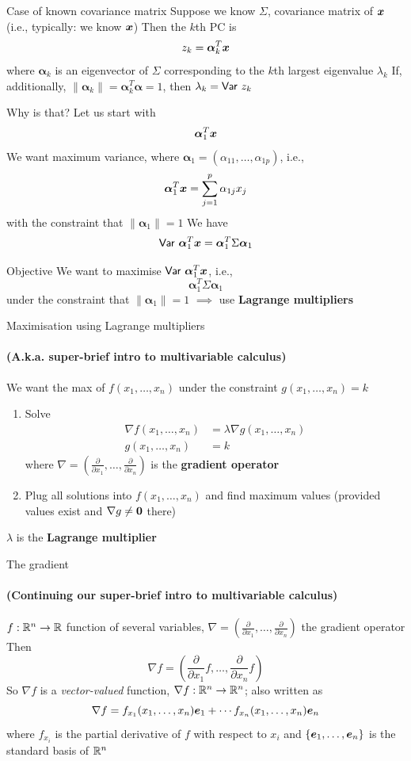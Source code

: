 \documentclass[aspectratio=169]{beamer}\usepackage[]{graphicx}\usepackage[]{xcolor}
\begin{document}
\begin{frame}{Case of known covariance matrix}
Suppose we know $\Sigma$, covariance matrix of $\bm{x}$ (i.e., typically: we know $\bm{x}$)
\vfill
Then the $k$th PC is 
\[
z_k=\bm{\alpha}_k^T\bm{x}
\]
where $\bm{\alpha}_k$ is an eigenvector of $\Sigma$ corresponding to the $k$th largest eigenvalue $\lambda_k$
\vfill
If, additionally, $\|\bm{\alpha}_k\|=\bm{\alpha}_k^T\bm{\alpha}=1$, then $\lambda_k=\mathsf{Var}\  z_k$
\end{frame}


\begin{frame}{Why is that?}
Let us start with
\[
\bm{\alpha}_1^T\bm{x}
\]
\vfill
We want maximum variance, where $\bm{\alpha}_1=(\alpha_{11},\ldots,\alpha_{1p})$, i.e.,
\[
\bm{\alpha}_1^T\bm{x} = \sum_{j=1}^p\alpha_{1j}x_j
\]
with the constraint that $\|\bm{\alpha}_1\|=1$
\vfill
We have
\[
\mathsf{Var}\  \bm{\alpha}_1^T\bm{x}
=\bm{\alpha}_1^T\Sigma\bm{\alpha}_1
\]
\end{frame}

\begin{frame}{Objective}
We want to maximise $\mathsf{Var}\  \bm{\alpha}_1^T\bm{x}$, i.e.,
\[
\bm{\alpha}_1^T\Sigma\bm{\alpha}_1
\]
under the constraint that $\|\bm{\alpha}_1\|=1$
\vfill
$\implies$ use \textbf{Lagrange multipliers}
\end{frame}


\begin{frame}{Maximisation using Lagrange multipliers}
\framesubtitle{(A.k.a. super-brief intro to multivariable calculus)}
We want the max of $f(x_1,\ldots,x_n)$ under the constraint $g(x_1,\ldots,x_n)=k$
\begin{enumerate}
\item Solve
\begin{align*}
\nabla f(x_1,\ldots,x_n) &= \lambda\nabla g(x_1,\ldots,x_n) \\
g(x_1,\ldots,x_n) &= k
\end{align*}
where $\nabla=(\frac{\partial}{\partial x_1},\ldots,\frac{\partial}{\partial x_n})$ is the \textbf{gradient operator}
\item Plug all solutions into $f(x_1,\ldots,x_n)$ and find maximum values (provided values exist and $\nabla g\neq \b0$ there)
\end{enumerate}
\vfill
$\lambda$ is the \textbf{Lagrange multiplier}
\end{frame}


\begin{frame}{The gradient}
\framesubtitle{(Continuing our super-brief intro to multivariable calculus)}
$f:\mathbb{R}^n\to\mathbb{R}$ function of several variables, $\nabla=\left(\frac{\partial}{\partial x_1},\ldots,\frac{\partial}{\partial x_n}\right)$ the gradient operator
\vfill
Then
\[
\nabla f = \left(
\frac{\partial}{\partial x_1}f,\ldots,
\frac{\partial}{\partial x_n}f
\right)
\]
\vfill
So $\nabla f$ is a \emph{vector-valued} function, $\nabla f:\mathbb{R}^n\to\mathbb{R}^n$; also written as
\[
\nabla f = f_{x_1}(x_1,\ldots,x_n)\bm{e}_1+\cdots f_{x_n}(x_1,\ldots,x_n)\bm{e}_n
\]
where $f_{x_i}$ is the partial derivative of $f$ with respect to $x_i$ and $\{\bm{e}_1,\ldots,\bm{e}_n\}$ is the standard basis of $\mathbb{R}^n$
\end{frame}
\end{document}

